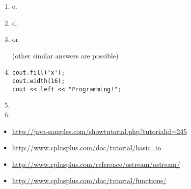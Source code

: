 \begin{enumerate}
	\item c.
	\item d.
	\item {} or
	
	
	(other similar answers are possible)
	\item
\noindent\begin{minipage}{\linewidth}\begin{lstlisting}
cout.fill('x');
cout.width(16);
cout << left << "Programming!";
\end{lstlisting}\end{minipage}
	\item {}
	\item {}
\end{enumerate}


\begin{itemize}
\item \url{http://java-samples.com/showtutorial.php?tutorialid=245}
\item \url{http://www.cplusplus.com/doc/tutorial/basic_io}
\item \url{http://www.cplusplus.com/reference/ostream/ostream/}
\item \url{http://www.cplusplus.com/doc/tutorial/functions/}
\end{itemize}	
